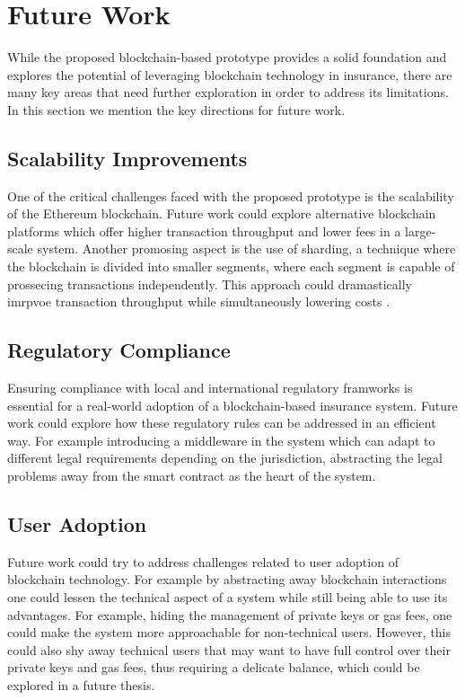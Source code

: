 \section{Future Work}\label{section:future_work}
While the proposed blockchain-based prototype provides a solid foundation and explores the potential of leveraging blockchain technology in insurance, there are many key areas that need further exploration in order to address its limitations. In this section we mention the key directions for future work.

\subsection{Scalability Improvements}
One of the critical challenges faced with the proposed prototype is the scalability of the Ethereum blockchain. Future work could explore alternative blockchain platforms which offer higher transaction throughput and lower fees in a large-scale system. Another promosing aspect is the use of sharding, a technique where the blockchain is divided into smaller segments, where each segment is capable of prossecing transactions independently. This approach could dramastically imrpvoe transaction throughput while simultaneously lowering costs \autocite{Hong2022Scaling}.

\subsection{Regulatory Compliance}
Ensuring compliance with local and international regulatory framworks is essential for a real-world adoption of a blockchain-based insurance system. Future work could explore how these regulatory rules can be addressed in an efficient way. For example introducing a middleware in the system which can adapt to different legal requirements depending on the jurisdiction, abstracting the legal problems away from the smart contract as the heart of the system.

\subsection{User Adoption}
Future work could try to address challenges related to user adoption of blockchain technology. For example by abstracting away blockchain interactions one could lessen the technical aspect of a system while still being able to use its advantages. For example, hiding the management of private keys or gas fees, one could make the system more approachable for non-technical users. However, this could also shy away technical users that may want to have full control over their private keys and gas fees, thus requiring a delicate balance, which could be explored in a future thesis.